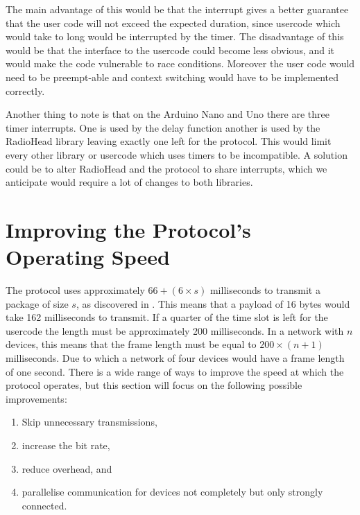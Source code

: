 The main advantage of this would be that the interrupt gives a better guarantee that the user code will not exceed the expected duration, since usercode which would take to long would be interrupted by the timer.
The disadvantage of this would be that the interface to the usercode could become less obvious, and it would make the code vulnerable to race conditions.
Moreover the user code would need to be preempt-able and context switching would have to be implemented correctly.

Another thing to note is that on the Arduino Nano and Uno there are three timer interrupts.
One is used by the delay function another is used by the RadioHead library leaving exactly one left for the protocol.
This would limit every other library or usercode which uses timers to be incompatible.
A solution could be to alter RadioHead and the protocol to share interrupts, which we anticipate would require a lot of changes to both libraries.

\section{Improving the Protocol's Operating Speed}
The protocol uses approximately $66 + (6 \times s)$ milliseconds to transmit a package of size $s$, as discovered in  . 
This means that a payload of 16 bytes would take 162 milliseconds to transmit.
If a quarter of the time slot is left for the usercode the length must be approximately 200 milliseconds.
In a network with $n$ devices, this means that the frame length must be equal to $200 \times (n + 1)$ milliseconds.
Due to which a network of four devices would have a frame length of one second.
There is a wide range of ways to improve the speed at which the protocol operates, but this section will focus on the following possible improvements:
\begin{enumerate}[label=\itshape \alph*\upshape)]
    \item Skip unnecessary transmissions,
    \item increase the bit rate, 
    \item reduce overhead, and
    \item parallelise communication for devices not completely but only strongly connected.
\end{enumerate} 

